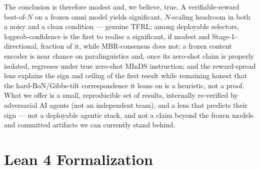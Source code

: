 The conclusion is therefore modest and, we believe, true. A verifiable-reward best-of-$N$ on a frozen
omni model yields significant, $N$-scaling headroom in both a noisy and a clean condition --- genuine
TFRL; among deployable selectors, logprob-confidence is the first to realise a significant, if modest and
Stage-1-directional, fraction of it, while MBR-consensus does not; a frozen content encoder is near
chance on paralinguistics and, once its zero-shot claim is properly isolated, regresses under true
zero-shot MInDS instruction; and the reward-spread lens explains the sign and ceiling of the first result
while remaining honest that the hard-BoN/Gibbs-tilt correspondence it leans on is a heuristic, not a
proof. What we offer is a small, reproducible set of results, internally re-verified by adversarial AI
agents (not an independent team), and a lens that predicts their sign --- not a deployable agentic
stack, and not a claim beyond the frozen models and committed artifacts we can currently stand behind.

\appendix

\section{Lean 4 Formalization}
\label{app:lean}

